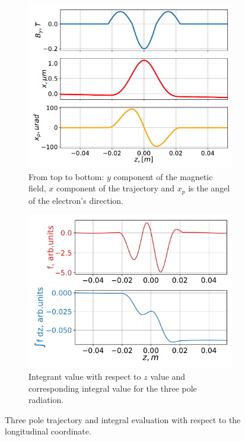     \begin{figure}[p]
        \centering
        \begin{subfigure}[c]{0.5\linewidth}  %
            \centering
            \includegraphics[width=\linewidth]{content/images/5_THz_Source/3pole_traj.pdf}
            \caption{From top to bottom: $y$ component of the magnetic field, $x$ component of the trajectory and $x_p$ is the angel of the electron's direction.} %
            \label{Fig:3pole_traj}
        \end{subfigure}%
        \begin{subfigure}[c]{0.5\linewidth}  %
            \centering
            \includegraphics[width=\linewidth]{content/images/5_THz_Source/3pole_integral.pdf}
            \caption{Integrant value with respect to $z$ value and corresponding integral value for the three pole radiation.} %
            \label{Fig:3pole_integral}
        \end{subfigure}
        \caption{Three pole trajectory and integral evaluation with respect to the longitudinal coordinate.} %
        \label{Fig:3pole_figs}
    \end{figure}
    
